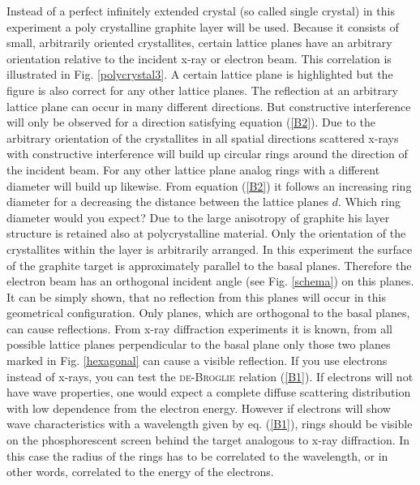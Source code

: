 \documentclass{tudphygp_eng}
\begin{document}
Instead of a perfect infinitely extended crystal (so called single crystal) in this experiment a poly crystalline graphite layer will be used. Because it consists of small, arbitrarily oriented crystallites, certain lattice planes have an arbitrary orientation relative to the incident x-ray or electron beam. This correlation is illustrated in Fig. \ref{polycrystal3}. A certain lattice plane is highlighted but the figure is also correct for any other lattice planes. The reflection at an arbitrary lattice plane can occur in many different directions. But constructive interference will only be observed for a direction satisfying equation (\ref{B2}). Due to the arbitrary orientation of the crystallites in all spatial directions scattered x-rays with constructive interference will build up circular rings around the direction of the incident beam. For any other lattice plane analog rings with a different diameter will build up likewise. From equation (\ref{B2}) it follows an increasing ring diameter for a decreasing the distance between the lattice planes $d$. Which ring diameter would you expect?
Due to the large anisotropy of graphite his layer structure is retained also at polycrystalline material. Only the orientation of the crystallites within the layer is arbitrarily arranged. In this experiment the surface of the graphite target is approximately parallel to the basal planes. Therefore the electron beam has an orthogonal incident angle (see Fig. \ref{schema}) on this planes. It can be simply shown, that no reflection from this planes will occur in this geometrical configuration. Only planes, which are orthogonal to the basal planes, can cause reflections. From x-ray diffraction experiments it is known, from all possible lattice planes perpendicular to the basal plane only those two planes marked in Fig. \ref{hexagonal} can cause a visible reflection. 
If you use electrons instead of x-rays, you can test the \textsc{de-Broglie} relation (\ref{B1}). If electrons will not have wave properties, one would expect a complete diffuse scattering distribution with low dependence from the electron energy. However if electrons will show wave characteristics with a wavelength given by eq. (\ref{B1}), rings should be visible on the phosphorescent screen behind the target analogous to x-ray diffraction. In this case the radius of the rings has to be correlated to the wavelength, or in other words, correlated to the energy of the electrons.


\end{document}
